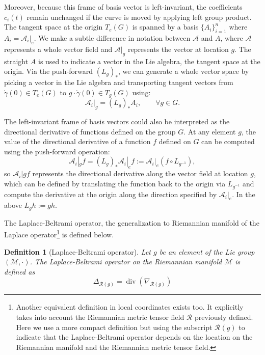\documentclass{article}
\newtheorem{definition}{Definition}[section]
\DeclareMathOperator{\dive}{div}
\begin{document}
Moreover, because this frame of basis vector is left-invariant, the coefficients $c_i(t)$ remain unchanged if the curve is moved by applying left group product. The tangent space at the origin $T_e(G)$ is spanned by a basis $\{A_i\}_{i=1}^n$ where $A_i = \mathcal{A}_i|_e$. We make a subtle difference in notation between $\mathcal{A}$ and $A$, where $\mathcal{A}$ represents a whole vector field and $\mathcal{A}|_g$ represents the vector at location $g$. The straight $A$ is used to indicate a vector in the Lie algebra, the tangent space at the origin. Via the push-forward $(L_g)_*$, we can generate a whole vector space by picking a vector in the Lie algebra and transporting tangent vectors from $\dot{\gamma}(0) \in T_e(G)$ to $g \cdot \dot{\gamma}(0) \in T_g(G)$ using:
\begin{equation}
\mathcal{A}_i|_g = (L_g)_* A_i , \qquad \forall g \in G.
\end{equation}

The left-invariant frame of basis vectors could also be interpreted as the directional derivative of functions defined on the group $G$. At any element $g$, the value of the directional derivative of a function $f$ defined on $G$ can be computed using the push-forward operation:
\begin{equation}
\mathcal{A}_i|_g f = (L_g)_* \mathcal{A}_i|_e f := \mathcal{A}_i|_e (f \circ L_{g^{-1}}),
\end{equation}
so $\mathcal{A}_i|g f$ represents the directional derivative along the vector field at location $g$, which can be defined by translating the function back to the origin via $L_{g^{-1}}$ and compute the derivative at the origin along the direction specified by $\mathcal{A}_i|_e$. In the above $L_g h:= g h$.

The Laplace-Beltrami operator, the generalization to Riemannian manifold of the Laplace operator\footnote{Another equivalent definition in local coordinates exists too. It explicitly takes into account the Riemannian metric tensor field $\mathcal{R}$ previously defined. Here we use a more compact definition but using the subscript $\mathcal{R}(g)$ to indicate that the Laplace-Beltrami operator depends on the location on the Riemannian manifold and the Riemannian metric tensor field.} is defined below.
\begin{definition}[Laplace-Beltrami operator] \label{def:laplace_beltrami}
Let $g$ be an element of the Lie group $(\mathcal{M}, \cdot)$. The Laplace-Beltrami operator on the Riemannian manifold $\mathcal{M}$ is defined as
\begin{equation}
\Delta_{\mathcal{R}(g)} = \dive (\nabla_{\mathcal{R}(g)})
\end{equation}
\end{definition}
\end{document}
